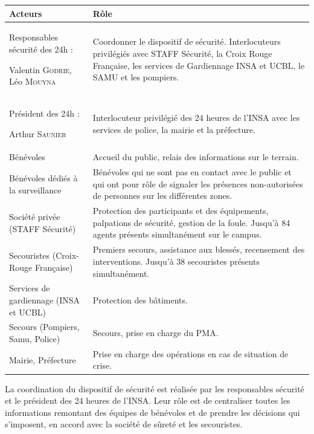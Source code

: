 \documentclass[hidelinks, paper=a4, fontsize=13pt]{report}
\begin{document}
\begin{center}
	\begin{tabular}{ | p{6cm} | p{10cm} | }
		\hline
		\cellcolor[gray]{0.9}
		Acteurs & \cellcolor[gray]{0.9} Rôle \\ \hline
		Responsables sécurité des 24h :
		
		Valentin \textsc{Godrie}, \newline
		Léo \textsc{Mouyna} & Coordonner le dispositif de sécurité. Interlocuteurs privilégiés avec STAFF Sécurité, la Croix Rouge Française, les services de Gardiennage INSA et UCBL, le SAMU et les  pompiers. \\ \hline
		Président des 24h :
		
		Arthur \textsc{Saunier} & Interlocuteur privilégié des 24 heures de l'INSA avec les services de police, la mairie et la préfecture. \\ \hline
		Bénévoles & Accueil du public, relais des informations sur le terrain. \\ \hline
		Bénévoles dédiés à la surveillance & Bénévoles qui ne sont pas en contact avec le public et qui ont pour rôle de signaler les présences non-autorisées de personnes sur les différentes zones. \\ \hline
		Société privée (STAFF Sécurité) & Protection des participants et des équipements, palpations de sécurité, gestion de la foule.
		Jusqu’à 84 agents présents simultanément sur le campus. \\ \hline
		Secouristes (Croix-Rouge Française) & Premiers secours, assistance aux blessés, recensement des interventions.
		Jusqu’à 38 secouristes présents simultanément. \\ \hline
		Services de gardiennage
		(INSA et UCBL) & Protection des bâtiments. \\ \hline
		Secours
		(Pompiers, Samu, Police) & Secours, prise en charge du PMA. \\ \hline
		Mairie, Préfecture & Prise en charge des opérations en cas de situation de crise. \\ \hline
	\end{tabular}
\end{center}

La coordination du dispositif de sécurité est réalisée par les responsables sécurité et le président des 24 heures de l’INSA. Leur rôle est de centraliser toutes les informations remontant des équipes de bénévoles et de prendre les décisions qui s’imposent, en accord avec la société de sûreté et les secouristes.\\
\end{document}
